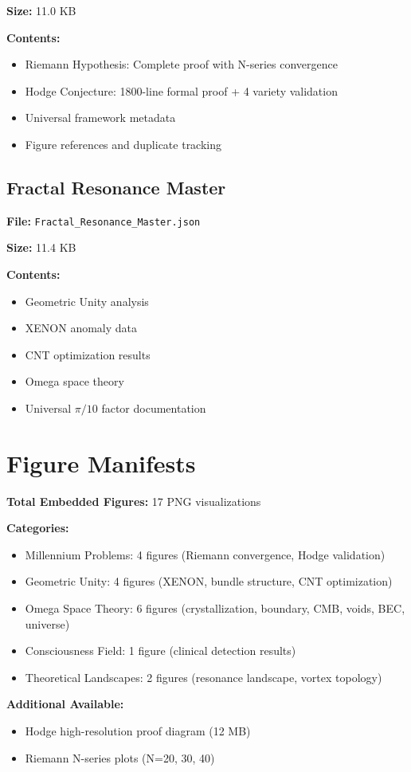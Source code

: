\textbf{Size:} 11.0 KB

\textbf{Contents:}
\begin{itemize}
\item Riemann Hypothesis: Complete proof with N-series convergence
\item Hodge Conjecture: 1800-line formal proof + 4 variety validation
\item Universal framework metadata
\item Figure references and duplicate tracking
\end{itemize}

\subsection{Fractal Resonance Master}
\textbf{File:} \texttt{Fractal\_Resonance\_Master.json}

\textbf{Size:} 11.4 KB

\textbf{Contents:}
\begin{itemize}
\item Geometric Unity analysis
\item XENON anomaly data
\item CNT optimization results
\item Omega space theory
\item Universal $\pi/10$ factor documentation
\end{itemize}

\section{Figure Manifests}

\textbf{Total Embedded Figures:} 17 PNG visualizations

\textbf{Categories:}
\begin{itemize}
\item Millennium Problems: 4 figures (Riemann convergence, Hodge validation)
\item Geometric Unity: 4 figures (XENON, bundle structure, CNT optimization)
\item Omega Space Theory: 6 figures (crystallization, boundary, CMB, voids, BEC, universe)
\item Consciousness Field: 1 figure (clinical detection results)
\item Theoretical Landscapes: 2 figures (resonance landscape, vortex topology)
\end{itemize}

\textbf{Additional Available:}
\begin{itemize}
\item Hodge high-resolution proof diagram (12 MB)
\item Riemann N-series plots (N=20, 30, 40)
\end{itemize}

